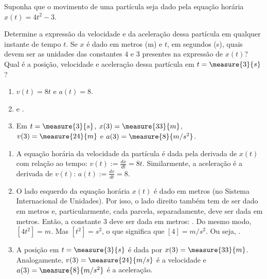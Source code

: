 \begin{question}
	Suponha que o movimento de uma partícula seja dado pela equação horária $x(t) = 4t^2 - 3$.
	\begin{inlineenum}
		\inlineitem Determine a expressão da velocidade e da aceleração dessa partícula em qualquer instante de tempo $t$.
		\inlineitem Se $x$ é dado em metros (\unit{m}) e $t$, em segundos (\unit{s}), quais devem ser as unidades das constantes $4$ e $3$ presentes na expressão de $x(t)$?
		\inlineitem Qual é a posição, velocidade e aceleração dessa partícula em $t = \measure{3}{s}$?
	\end{inlineenum}

	\begin{answer}
		\begin{enumerate}
			\item $v(t) = 8t$ e $a(t) = 8$.
			\item {} e .
			\item Em $t = \measure{3}{s}$, $x(3) = \measure{33}{m}$, $v(3) = \measure{24}{m}$ e $a(3) = \measure{8}{m/s^2}$.
		\end{enumerate}
	\end{answer}

	\begin{solution}
		\begin{enumerate}
			\item A equação horária da velocidade da partícula é dada pela derivada de $x(t)$ com relação ao tempo: $v(t) := \frac{dx}{dt} = 8t$.
			Similarmente, a aceleração é a derivada de $v(t)$: $a(t) := \frac{dv}{dt} = 8$.
			\item O lado esquerdo da equação horária $x(t)$ é dado em metros (no Sistema Internacional de Unidades).
			Por isso, o lado direito também tem de ser dado em metros e, particularmente, cada parcela, separadamente, deve ser dada em metros.
			Então, a constante $3$ deve ser dada em metros: .
			Do mesmo modo, $[4t^2] = \unit{m}$.
			Mas $[t^2] = \unit{s^2}$, o que significa que $[4] = \unit{m/s^2}$.
			Ou seja, .
			\item A posição em $t = \measure{3}{s}$ é dada por $x(3) = \measure{33}{m}$.
			Analogamente, $v(3) = \measure{24}{m/s}$ é a velocidade e $a(3) = \measure{8}{m/s^2}$ é a aceleração.
		\end{enumerate}
	\end{solution}
\end{question}
